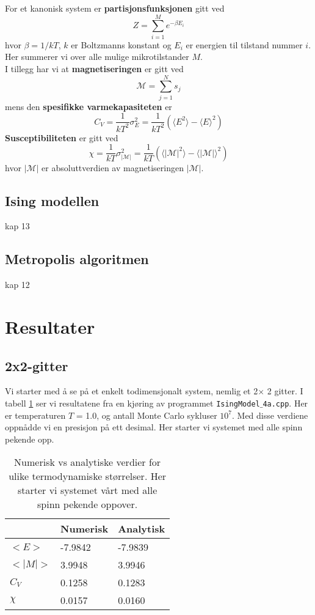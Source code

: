 \documentclass[11pt,a4paper]{article}
\begin{document}
For et kanonisk system er \textbf{partisjonsfunksjonen} gitt ved
\begin{equation}
Z = \sum_{i=1}^M e^{-\beta E_i }
\end{equation}
hvor $\beta = 1/kT$, $k$ er Boltzmanns konstant og $E_i$ er energien til tilstand nummer $i$. Her summerer vi over alle mulige mikrotilstander $M$.\\
I tillegg har vi at \textbf{magnetiseringen} er gitt ved
\begin{equation}
\mathcal{M} = \sum_{j=1} ^N s_j
\end{equation}
mens den \textbf{spesifikke varmekapasiteten} er
\begin{equation}
C_V = \frac{1}{kT^2}\sigma_E^2 = \frac{1}{kT^2}(\langle E^2 \rangle - \langle E \rangle^2 )
\end{equation}
\textbf{Susceptibiliteten} er gitt ved
\begin{equation}
\chi = \frac{1}{kT} \sigma_{|\mathcal{M}|}^2 = \frac{1}{kT}( \langle \mathcal{|M|}^2 \rangle - \langle |\mathcal{M}| \rangle^2 )
\end{equation}
hvor $|\mathcal{M} |$ er absoluttverdien av magnetiseringen $|\mathcal{M} |$.

\subsection{Ising modellen}
kap 13
\subsection{Metropolis algoritmen}
kap 12

\section{Resultater}
\subsection{2x2-gitter}
Vi starter med å se på et enkelt todimensjonalt system, nemlig et 2$\times$ 2 gitter. I tabell \ref{num_vs_an} ser vi resultatene fra en kjøring av programmet \texttt{IsingModel$\_$4a.cpp}. Her er temperaturen $T$ = 1.0, og antall Monte Carlo sykluser $10^7$. Med disse verdiene oppnådde vi en presisjon på ett desimal. Her starter vi systemet med alle spinn pekende opp.

\FloatBarrier
\begin{table}[!ht]
\centering
\caption{Numerisk vs analytiske verdier for ulike termodynamiske størrelser. Her starter vi systemet vårt med alle spinn pekende oppover.}
\label{num_vs_an}
\begin{tabular}{|l|l|l|}
\hline
        & Numerisk & Analytisk \\ \hline
$<E>$   & -7.9842  & -7.9839   \\ \hline
$<|M|>$ & 3.9948   & 3.9946    \\ \hline
$C_V$   & 0.1258   & 0.1283    \\ \hline
$\chi$  & 0.0157   & 0.0160    \\ \hline
\end{tabular}
\end{table}
\FloatBarrier
\end{document}
